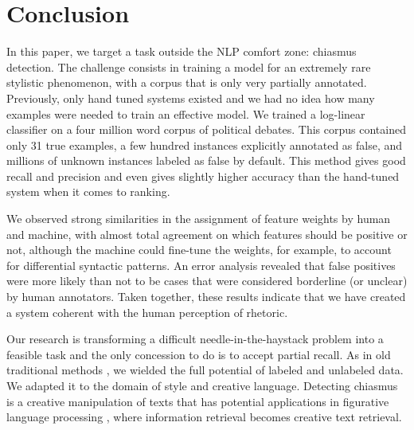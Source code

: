 \documentclass[11pt]{article}
\begin{document}

\section{Conclusion}
In this paper, we target a task outside the NLP comfort zone: chiasmus detection. The challenge consists in training a model for an extremely rare stylistic phenomenon, with a corpus that is only very partially annotated. Previously, only hand tuned systems existed and we had no idea how many examples were needed to train an effective model. We trained a log-linear classifier on a four million word corpus of political debates. This corpus contained only 31 true examples, a few hundred instances explicitly annotated as false, and millions of unknown instances labeled as false by default. This method gives good recall and precision and even gives slightly higher accuracy than the hand-tuned system when it comes to ranking. 

We observed strong similarities in the assignment of feature weights by human and machine, with almost total agreement on which features should be positive or not, although the machine could fine-tune the weights, for example, to account for differential syntactic patterns. An error analysis revealed that false positives were more likely than not to be cases that were considered borderline (or unclear) by human annotators. Taken together, these results indicate that we have created a system coherent with the human perception of rhetoric. 

Our research is transforming a difficult needle-in-the-haystack problem into a feasible task and the only concession to do is to accept partial recall. As in old traditional methods \cite{Blum1998,Yarowsky1995}, we wielded the full potential of labeled and unlabeled data. We adapted it to the domain of style and creative language. Detecting chiasmus is a creative manipulation of texts that has potential applications in figurative language processing \cite{Veale2011}, where information retrieval becomes creative text retrieval.
\end{document}
